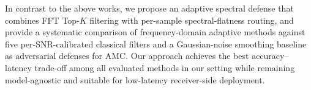 In contrast to the above works, we propose an adaptive spectral defense that
combines FFT Top-$K$ filtering with per-sample spectral-flatness routing,
and provide a systematic comparison of frequency-domain adaptive methods
against five per-SNR-calibrated classical filters and a Gaussian-noise
smoothing baseline as adversarial defenses for AMC. Our approach achieves
the best accuracy--latency trade-off among all evaluated methods in our
setting while remaining model-agnostic and suitable for low-latency
receiver-side deployment.
